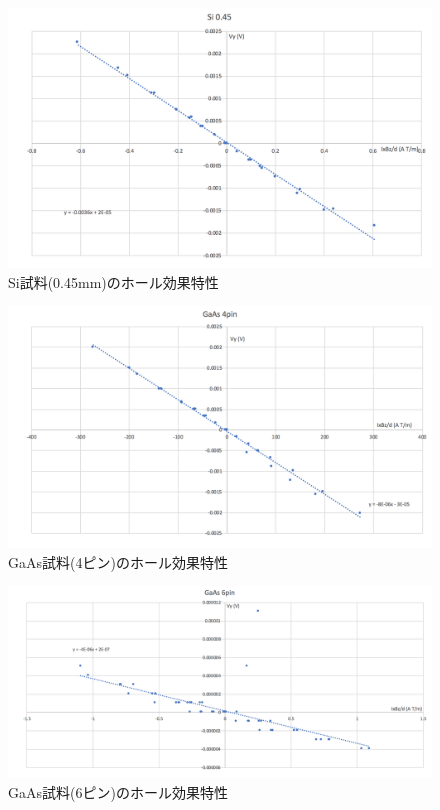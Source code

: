\documentclass[dvipdfmx]{jsarticle}
\begin{document}
\begin{figure}[H]
\begin{center}
\includegraphics[scale = 0.6]{GaAs6.png}
\caption{Si試料(0.45mm)のホール効果特性}
\end{center}
\end{figure}

\begin{figure}[H]
\begin{center}
\includegraphics[scale = 0.6]{GaAs4.png}
\caption{GaAs試料(4ピン)のホール効果特性}
\end{center}
\end{figure}

\begin{figure}[H]
\begin{center}
\includegraphics[scale = 0.6]{Si045.png}
\caption{GaAs試料(6ピン)のホール効果特性}
\end{center}
\end{figure}
\end{document}
